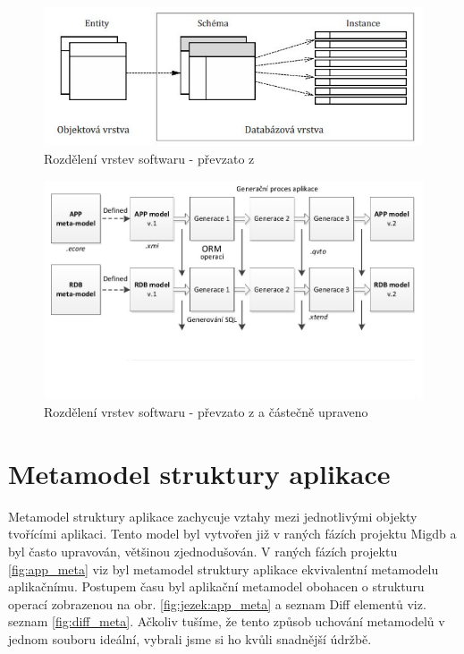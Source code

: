 \documentclass[11pt,twoside,a4paper]{book}
\begin{document}
\begin{figure}[ht]
\begin{center}
\includegraphics[width=15cm]{figures/framework_structura}
\caption{Rozdělení vrstev softwaru - převzato z \cite{Mazanec}}
\label{fig:mazanma:framework}
\end{center}
\end{figure}


\begin{figure}[ht]
\begin{center}
\includegraphics[width=15cm]{figures/framework_structura_tarant_modified}
\caption{Rozdělení vrstev softwaru - převzato z \cite{Tarant_bp} a částečně
upraveno}
\label{fig:framework:modified}
\end{center}
\end{figure}


\section{Metamodel struktury aplikace}

Metamodel struktury aplikace zachycuje vztahy mezi jednotlivými objekty
tvořícími aplikaci. Tento model byl vytvořen již v raných fázích projektu Migdb a
byl často upravován, většinou zjednodušován. V raných fázích projektu
\ref{fig:app_meta} viz \cite{Lukes} byl metamodel struktury aplikace
ekvivalentní metamodelu aplikačnímu. Postupem času byl aplikační metamodel obohacen o
strukturu operací zobrazenou na obr. \ref{fig:jezek:app_meta} a seznam Diff
elementů viz. seznam \ref{fig:diff_meta}.
Ačkoliv tušíme, že tento způsob uchování metamodelů v jednom souboru ideální,
vybrali jsme si ho kvůli snadnější údržbě.
\end{document}
